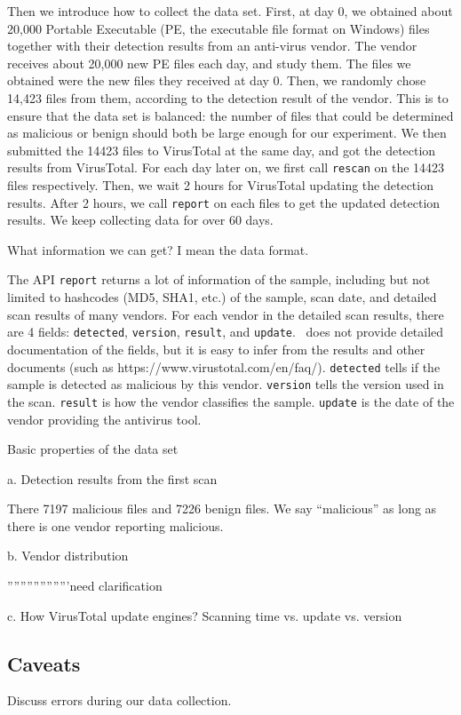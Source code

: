 Then we introduce how to collect the data set. First, at day 0, we obtained about 20,000 Portable Executable (PE, the executable file format on Windows) files together with their detection results from an anti-virus vendor. The vendor receives about 20,000 new PE files each day, and study them. The files we obtained were the new files they received at day 0. Then, we randomly chose 14,423 files from them, according to the detection result of the vendor. This is to ensure that the data set is balanced: the number of files that could be determined as malicious or benign should both be large enough for our experiment. We then submitted the 14423 files to VirusTotal at the same day, and got the detection results from VirusTotal. For each day later on, we first call \texttt{rescan} on the 14423 files respectively. Then, we wait 2 hours for VirusTotal updating the detection results. After 2 hours, we call \texttt{report} on each files to get the updated detection results. We keep collecting data for over 60 days. 

What information we can get? I mean the data format. 

The API \texttt{report} returns a lot of information of the sample, including but not limited to hashcodes (MD5, SHA1, etc.) of the sample, scan date, and detailed scan results of many vendors. For each vendor in the detailed scan results, there are 4 fields: \texttt{detected}, \texttt{version}, \texttt{result}, and \texttt{update}. \vt\ does not provide detailed documentation of the fields, but it is easy to infer from the results and other documents (such as https://www.virustotal.com/en/faq/). \texttt{detected} tells if the sample is detected as malicious by this vendor. \texttt{version} tells the version used in the scan. \texttt{result} is how the vendor classifies the sample. \texttt{update} is the date of the vendor providing the antivirus tool.

Basic properties of the data set 

a. Detection results from the first scan

There 7197 malicious files and 7226 benign files. We say ``malicious'' as long as there is one vendor reporting malicious.

b. Vendor distribution

'''''''''''''''''''need clarification%

c. How VirusTotal update engines? Scanning time vs. update vs. version 
\subsection{Caveats}

Discuss errors during our data collection. 
